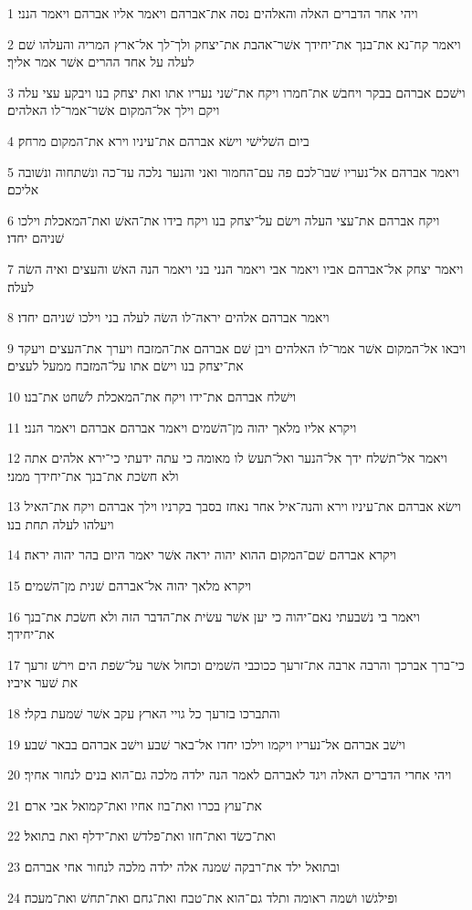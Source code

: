 \par 1 ויהי אחר הדברים האלה והאלהים נסה את־אברהם ויאמר אליו אברהם ויאמר הנני׃
\par 2 ויאמר קח־נא את־בנך את־יחידך אשׁר־אהבת את־יצחק ולך־לך אל־ארץ המריה והעלהו שׁם לעלה על אחד ההרים אשׁר אמר אליך׃
\par 3 וישׁכם אברהם בבקר ויחבשׁ את־חמרו ויקח את־שׁני נעריו אתו ואת יצחק בנו ויבקע עצי עלה ויקם וילך אל־המקום אשׁר־אמר־לו האלהים׃
\par 4 ביום השׁלישׁי וישׂא אברהם את־עיניו וירא את־המקום מרחק׃
\par 5 ויאמר אברהם אל־נעריו שׁבו־לכם פה עם־החמור ואני והנער נלכה עד־כה ונשׁתחוה ונשׁובה אליכם׃
\par 6 ויקח אברהם את־עצי העלה וישׂם על־יצחק בנו ויקח בידו את־האשׁ ואת־המאכלת וילכו שׁניהם יחדו׃
\par 7 ויאמר יצחק אל־אברהם אביו ויאמר אבי ויאמר הנני בני ויאמר הנה האשׁ והעצים ואיה השׂה לעלה׃
\par 8 ויאמר אברהם אלהים יראה־לו השׂה לעלה בני וילכו שׁניהם יחדו׃
\par 9 ויבאו אל־המקום אשׁר אמר־לו האלהים ויבן שׁם אברהם את־המזבח ויערך את־העצים ויעקד את־יצחק בנו וישׂם אתו על־המזבח ממעל לעצים׃
\par 10 וישׁלח אברהם את־ידו ויקח את־המאכלת לשׁחט את־בנו׃
\par 11 ויקרא אליו מלאך יהוה מן־השׁמים ויאמר אברהם אברהם ויאמר הנני׃
\par 12 ויאמר אל־תשׁלח ידך אל־הנער ואל־תעשׂ לו מאומה כי עתה ידעתי כי־ירא אלהים אתה ולא חשׂכת את־בנך את־יחידך ממני׃
\par 13 וישׂא אברהם את־עיניו וירא והנה־איל אחר נאחז בסבך בקרניו וילך אברהם ויקח את־האיל ויעלהו לעלה תחת בנו׃
\par 14 ויקרא אברהם שׁם־המקום ההוא יהוה יראה אשׁר יאמר היום בהר יהוה יראה׃
\par 15 ויקרא מלאך יהוה אל־אברהם שׁנית מן־השׁמים׃
\par 16 ויאמר בי נשׁבעתי נאם־יהוה כי יען אשׁר עשׂית את־הדבר הזה ולא חשׂכת את־בנך את־יחידך׃
\par 17 כי־ברך אברכך והרבה ארבה את־זרעך ככוכבי השׁמים וכחול אשׁר על־שׂפת הים וירשׁ זרעך את שׁער איביו׃
\par 18 והתברכו בזרעך כל גויי הארץ עקב אשׁר שׁמעת בקלי׃
\par 19 וישׁב אברהם אל־נעריו ויקמו וילכו יחדו אל־באר שׁבע וישׁב אברהם בבאר שׁבע׃
\par 20 ויהי אחרי הדברים האלה ויגד לאברהם לאמר הנה ילדה מלכה גם־הוא בנים לנחור אחיך׃
\par 21 את־עוץ בכרו ואת־בוז אחיו ואת־קמואל אבי ארם׃
\par 22 ואת־כשׂד ואת־חזו ואת־פלדשׁ ואת־ידלף ואת בתואל׃
\par 23 ובתואל ילד את־רבקה שׁמנה אלה ילדה מלכה לנחור אחי אברהם׃
\par 24 ופילגשׁו ושׁמה ראומה ותלד גם־הוא את־טבח ואת־גחם ואת־תחשׁ ואת־מעכה׃

